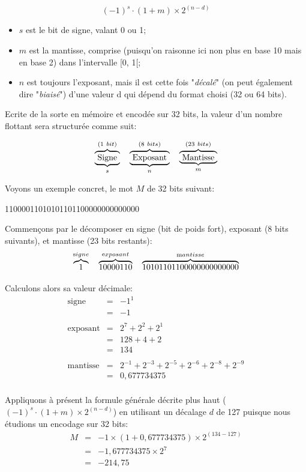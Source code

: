 \documentclass[12pt]{article}
\begin{document}
	\[(-1)^s\cdot (1+m) \times 2^{(n-d)}\]
	
	\begin{itemize}
		\item $s$ est le bit de signe, valant 0 ou 1;
		\item $m$ est la mantisse, comprise (puisqu'on raisonne ici non plus en base 10 mais en base 2) dans l'intervalle [0, 1[;
		\item $n$ est toujours l'exposant, mais il est cette fois "\textit{décalé}" (on peut également dire "\textit{biaisé}") d'une valeur d qui dépend du format choisi (32 ou 64 bits).
	\end{itemize}
	
	Ecrite de la sorte en mémoire et encodée sur 32 bits, la valeur d'un nombre flottant sera structurée comme suit:
	
	 \[ \overbrace{\underbrace{\text{ Signe }}_{s}}^{\text(1\ bit)} \quad \overbrace{\underbrace{\text{ Exposant }}_{n}}^{\text(8\  bits)} \quad \overbrace{\underbrace{\text{ Mantisse }}_{m}}^{\text(23\  bits)} \]
	
	Voyons un exemple concret, le mot $M$ de 32 bits suivant:
	\begin{center}
		11000011010101101100000000000000
	\end{center}
	Commençons par le décomposer en signe (bit de poids fort), exposant (8 bits suivants), et mantisse (23 bits restants):
	\[ \overbrace{1}^{\text signe} \quad
	\overbrace{10000110}^{\text exposant} \quad
	\overbrace{10101101100000000000000}^{\text mantisse} \]
	
	Calculons alors sa valeur décimale:
	\[
	\begin{array}{lll}
		\text{signe} & \text{=} & -1^1\\
		& \text{=} & -1\\
		\\
		\text{exposant} & \text{=} & 2^7 + 2^2 + 2^1\\
		& \text{=} & 128 + 4 + 2\\
		& \text{=} & 134\\
		\\
		\text{mantisse} & \text{=} & 2^{-1} + 2^{-3} + 2^{-5} + 2^{-6} + 2^{-8} + 2^{-9}\\
		& \text{=} & 0,677734375\\
	\end{array}
	\]
	
	Appliquons à présent la formule générale décrite plus haut ($(-1)^s\cdot (1+m) \times 2^{(n-d)}$) en utilisant un décalage $d$ de 127 puisque nous étudions un encodage sur 32 bits:
	\[
	\begin{array}{lll}
		M& \text{=} & -1 \times (1+0,677734375) \times 2^{(134 - 127)}\\
		& \text{=} & -1,677734375 \times 2^7\\
		& \text{=} & -214,75\
	\end{array}
	\]
		
\end{document}
